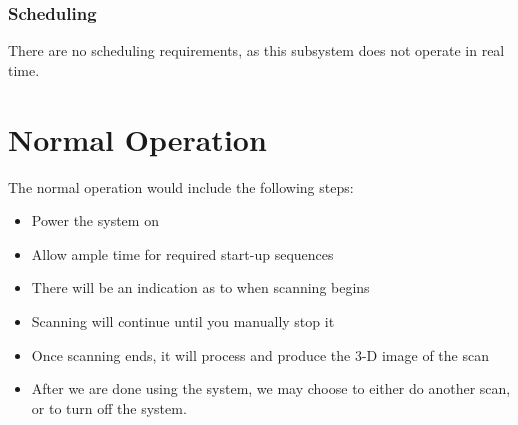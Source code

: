 \documentclass[11pt]{article}
\begin{document}
\subsubsection{Scheduling}
There are no scheduling requirements, as this subsystem does not operate in real time.  

	\section{Normal Operation}
		The normal operation would include the following steps: 
		\begin{itemize}
			\item Power the system on 
			\item Allow ample time for required start-up sequences  \item There will be an indication as to when scanning begins 
			\item Scanning will continue until you manually stop it 
			\item Once scanning ends, it will process and produce the 3-D image of the scan  
			\item After we are done using the system, we may choose to either do another scan, or to turn off the system. 
		\end{itemize}
\end{document}

